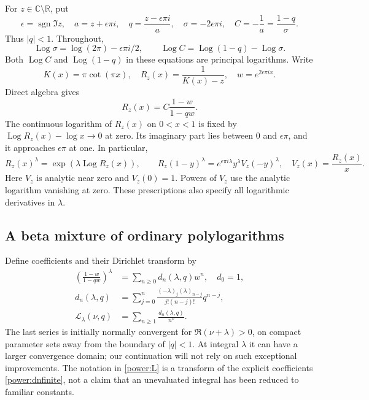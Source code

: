 \documentclass[11pt,a4paper]{article}
\numberwithin{equation}{section}
\theoremstyle{definition}
\theoremstyle{remark}
\DeclareMathOperator{\Log}{Log}
\begin{document}
For $z\in\mathbb C\setminus\mathbb R$, put
\begin{equation}\label{power:coordinates}
 \epsilon=\operatorname{sgn}\Im z,\quad
 a=z+\epsilon\pi i,\quad q=\frac{z-\epsilon\pi i}{a},\quad
 \sigma=-2\epsilon\pi i,\quad C=-\frac1a=\frac{1-q}{\sigma}.
\end{equation}
Thus $|q|<1$.  Throughout,
\[
 \Log\sigma=\log(2\pi)-\epsilon\pi i/2,
 \qquad \Log C=\Log(1-q)-\Log\sigma.
\]
Both $\Log C$ and $\Log(1-q)$ in these equations are principal
logarithms.  Write
\begin{equation}\label{power:R}
 K(x)=\pi\cot(\pi x),\quad R_z(x)=\frac1{K(x)-z},\quad
 w=e^{2\epsilon\pi ix}.
\end{equation}
Direct algebra gives
\begin{equation}\label{power:factor}
 R_z(x)=C\frac{1-w}{1-qw}.
\end{equation}
The continuous logarithm of $R_z(x)$ on $0<x<1$ is fixed by
$\Log R_z(x)-\log x\to0$ at zero.  Its imaginary part lies between
$0$ and $\epsilon\pi$, and it approaches $\epsilon\pi$ at one.
In particular,
\begin{equation}\label{power:branches}
 R_z(x)^\lambda=\exp(\lambda\Log R_z(x)),\qquad
 R_z(1-y)^\lambda=e^{\epsilon\pi i\lambda}y^\lambda
                       V_z(-y)^\lambda,
 \quad V_z(x)=\frac{R_z(x)}x.
\end{equation}
Here $V_z$ is analytic near zero and $V_z(0)=1$.  Powers of $V_z$
use the analytic logarithm vanishing at zero.  These prescriptions also
specify all logarithmic derivatives in $\lambda$.

\subsection{A beta mixture of ordinary polylogarithms}

Define coefficients and their Dirichlet transform by
\begin{align}
 \left(\frac{1-w}{1-qw}\right)^\lambda
   &=\sum_{n\ge0}d_n(\lambda,q)w^n,\quad d_0=1,
       \label{power:dn}\\
 d_n(\lambda,q)&=\sum_{j=0}^n
       \frac{(-\lambda)_j(\lambda)_{n-j}}{j!(n-j)!}q^{n-j},
       \label{power:dnfinite}\\
 \mathcal L_\lambda(\nu,q)&=\sum_{n\ge1}
                               \frac{d_n(\lambda,q)}{n^\nu}.
       \label{power:L}
\end{align}
The last series is initially normally convergent for
$\Re(\nu+\lambda)>0$, on compact parameter sets away from the boundary
of $|q|<1$.  At integral $\lambda$ it can have a larger convergence
domain; our continuation will not rely on such exceptional improvements.
The notation in \eqref{power:L} is a transform of the explicit
coefficients \eqref{power:dnfinite}, not a claim that an unevaluated
integral has been reduced to familiar constants.
\end{document}
